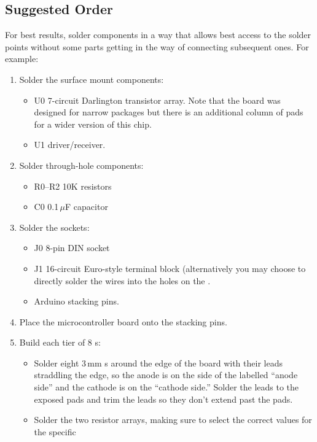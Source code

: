 \subsection{Suggested Order}
For best results, solder components in a way that allows best access to the
solder points without some parts getting in the way of connecting subsequent ones. For example:
\begin{enumerate}
	\item Solder the surface mount components:
		\begin{itemize}
			\item U0  7-circuit  Darlington transistor array.
				Note that the board was designed for narrow  packages but
				there is an additional column of pads for a wider version of this chip.
			\item U1   driver/receiver.
		\end{itemize}
	\item Solder through-hole components:
		\begin{itemize}
			\item R0--R2 10K resistors
			\item C0 0.1\,$\mu$F capacitor
		\end{itemize}
	\item Solder the sockets:
		\begin{itemize}
			\item J0 8-pin DIN socket
			\item J1 16-circuit Euro-style terminal block (alternatively you may choose to
				directly solder the  wires into the holes on the .
			\item Arduino stacking pins.
		\end{itemize}
	\item Place the microcontroller board onto the stacking pins.
	\item Build each  tier of 8 s:
		\begin{itemize}
			\item Solder eight 3\,mm s around the edge of the board with their leads straddling
				the edge, so the anode is on the side of the  labelled ``anode side'' and the
				cathode is on the ``cathode side.'' Solder the leads to the exposed pads and trim the
				leads so they don't extend past the pads.
			\item Solder the two resistor arrays, making sure to select the correct values for the specific

\end{itemize}
\end{enumerate}
